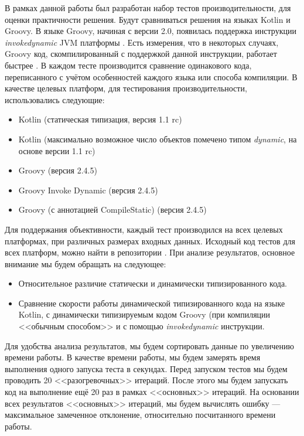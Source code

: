 В рамках данной работы был разработан набор тестов производительности, для оценки практичности решения. Будут сравниваться решения на языках Kotlin и Groovy. В языке Groovy, начиная с версии 2.0, появилась поддержка инструкции \textit{invokedynamic} JVM платформы \cite{groovy:invokeDynamicSupport}. Есть измерения, что в некоторых случаях, Groovy код, скомпилированный с поддержкой данной инструкции, работает быстрее \cite{groovy:indyTest1}.
В каждом тесте производится сравнение одинакового кода, переписанного с учётом особенностей каждого языка или способа компиляции. В качестве целевых платформ, для тестирования производительности, использовались следующие:

\begin{itemize}
    \item Kotlin (статическая типизация, версия 1.1 rc) 
    \item Kotlin (максимально возможное число объектов помечено типом \textit{dynamic}, на основе версии 1.1 rc)
    \item Groovy (версия 2.4.5)
    \item Groovy Invoke Dynamic (версия 2.4.5)
    \item Groovy (с аннотацией \at CompileStatic) (версия 2.4.5)
\end{itemize}


Для поддержания объективности, каждый тест производился на всех целевых платформах, при различных размерах входных данных. Исходный код тестов для всех платформ, можно найти в репозитории \cite{github:myBenchs}. При анализе результатов, основное внимание мы будем обращать на следующее:

\begin{itemize}
    \item Относительное различие статически и динамически типизированного кода.
    \item Сравнение скорости работы динамической типизированного кода на языке Kotlin, с динамически типизируемым кодом Groovy (при компиляции <<обычным способом>> и с помощью \textit{invokedynamic} инструкции.
\end{itemize}

Для удобства анализа результатов, мы будем сортировать данные по увеличению времени работы. В качестве времени работы, мы будем замерять время выполнения одного запуска теста в секундах. Перед запуском тестов мы будем проводить 20 <<разогревочных>> итераций. После этого мы будем запускать код на выполнение ещё 20 раз в рамках <<основных>> итераций. На основании всех результатов <<основных>> итераций, мы будем вычислять ошибку --- максимальное замеченное отклонение, относительно посчитанного времени работы.

